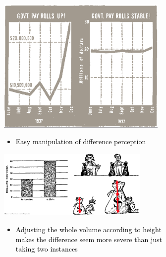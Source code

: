 \begin{note}
\begin{figure}[h]
  \begin{subfigure}{0.45\textwidth}
    \centering
    \includegraphics[width=0.9\textwidth]{assets/visualization_and_extraction/lie/scale.png}
    \begin{itemize}
      \item \textcolor{black}{\small Easy manipulation of difference perception} 
    \end{itemize}
  \end{subfigure}

  \vspace*{0.5cm}
  \begin{subfigure}{0.7\textwidth}
    \centering
    \includegraphics[width=0.8\textwidth]{assets/visualization_and_extraction/lie/factor.png}
    \begin{itemize}
      \item \textcolor{black}{\small Adjusting the whole volume according to height makes the difference seem more severe than just taking two instances} 
    \end{itemize}
  \end{subfigure}


\end{figure}
\end{note}
